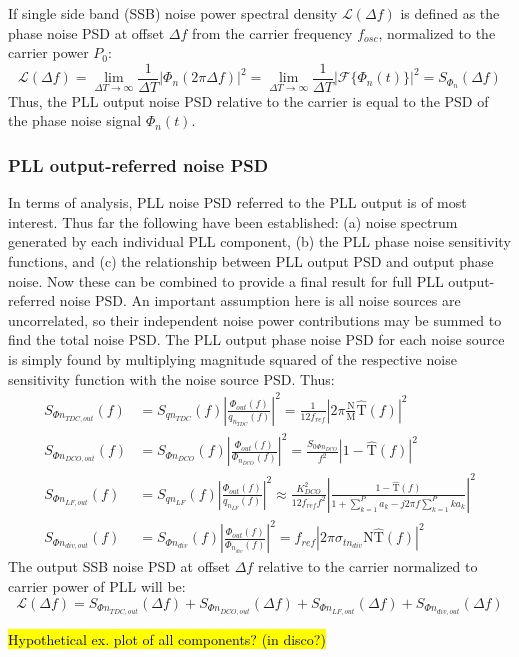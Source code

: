 		 If single side band (SSB) noise power spectral density $\mathcal{L}(\Delta f)$ is defined as the phase noise PSD at offset $\Delta f$ from the carrier frequency $f_{osc}$, normalized to the carrier power $P_0$:
		\begin{equation}
			\mathcal{L}(\Delta f) = \lim_{\Delta T\rightarrow\infty}\frac{1}{\Delta T}|\Phi_{n}(2\pi\Delta f)|^2 = \lim_{\Delta T\rightarrow\infty}\frac{1}{\Delta T}|\mathcal{F}\{\Phi_{n}(t)\}|^2= S_{\Phi_{n}}(\Delta f)
		\end{equation}
		Thus, the PLL output noise PSD relative to the carrier is equal to the PSD of the phase noise signal $\Phi_{n}(t)$.

	\subsubsection{PLL output-referred noise PSD}
	In terms of analysis, PLL noise PSD referred to the PLL output is of most interest. Thus far the following have been established: (a) noise spectrum generated by each individual PLL component, (b) the PLL phase noise sensitivity functions, and (c) the relationship between PLL output PSD and output phase noise. Now these can be combined to provide a final result for full PLL output-referred noise PSD. An important assumption here is all noise sources are uncorrelated, so their independent noise power contributions may be summed to find the total noise PSD. The PLL output phase noise PSD for each noise source is simply found by multiplying magnitude squared of the respective noise sensitivity function with the noise source PSD. Thus:
	\begin{align}
		S_{\Phi n_{TDC,out}}(f) &= S_{qn_{TDC}}(f)\left|\frac{\Phi_{out}(f)}{q_{n_{TDC}}(f)}\right|^2 = \frac{1}{12f_{ref}}\left|2\pi\frac{\mathrm{N}}{\mathrm{M}}\hat{\mathrm{T}}(f)\right|^2\\
		S_{\Phi n_{DCO,out}}(f) &= S_{\Phi n_{DCO}}(f)\left|\frac{\Phi_{out}(f)}{\Phi_{n_{DCO}}(f)}\right|^2  = \frac{S_{0\Phi n_{DCO}}}{f^2}\left|1-\hat{\mathrm{T}}(f)\right|^2\\		
		S_{\Phi n_{LF,out}}(f) &= S_{q n_{LF}}(f)\left|\frac{\Phi_{out}(f)}{q_{n_{LF}}(f)}\right|^2 \approx \frac{K_{DCO}^2}{12f_{ref}f^2}\left|\frac{1-\hat{\mathrm{T}}(f)}{1+\sum_{k=1}^P a_k - j2\pi f\sum_{k=1}^P ka_k}\right|^2\\
		S_{\Phi n_{div,out}}(f) &= S_{\Phi n_{div}}(f)\left|\frac{\Phi_{out}(f)}{\Phi_{n_{div}}(f)}\right|^2 = f_{ref}\left|2\pi\sigma_{tn_{div}}\mathrm{N}\hat{\mathrm{T}}(f)\right|^2
	\end{align}
	The output SSB noise PSD at offset $\Delta f$ relative to the carrier normalized to carrier power of PLL will be:
	\begin{equation}
		\mathcal{L}(\Delta f) = S_{\Phi n_{TDC,out}}(\Delta f) + S_{\Phi n_{DCO,out}}(\Delta f) + S_{\Phi n_{LF,out}}(\Delta f) + S_{\Phi n_{div,out}}(\Delta f)
	\end{equation}



	\hl{Hypothetical ex. plot of all components? (in disco?)}



